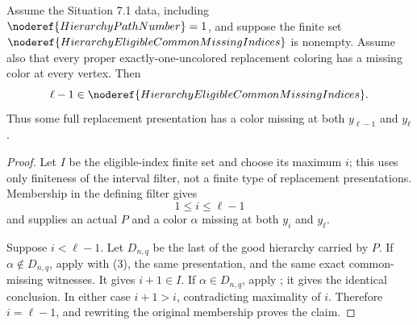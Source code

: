 \begin{lemma}
Assume the Situation 7.1 data, including
\(\noderef{HierarchyPathNumber}=1\), and suppose the finite set
\(\noderef{HierarchyEligibleCommonMissingIndices}\) is nonempty.  Assume
also that every proper exactly-one-uncolored replacement coloring has a
missing color at every vertex.  Then
\[
 \ell-1\in\noderef{HierarchyEligibleCommonMissingIndices}.
\]
Thus some full replacement presentation has a color missing at both
\(y_{\ell-1}\) and \(y_\ell\).
\end{lemma}
\begin{proof}
Let \(I\) be the eligible-index finite set and choose its maximum \(i\);
this uses only finiteness of the interval filter, not a finite type of
replacement presentations.  Membership in the defining filter gives
\[
 1\leq i\leq\ell-1                                      \tag{3}
\]
and supplies an actual
 \(P\) and a color \(\alpha\)
missing at both \(y_i\) and \(y_\ell\).

Suppose \(i<\ell-1\).  Let \(D_{n,q}\) be the last
 of the good hierarchy carried by \(P\).
If \(\alpha\notin D_{n,q}\), apply
 with (3), the same
presentation, and the same exact common-missing witnesses.  It gives
\(i+1\in I\).  If \(\alpha\in D_{n,q}\), apply
; it gives the identical
conclusion.  In either case \(i+1>i\), contradicting maximality of \(i\).
Therefore \(i=\ell-1\), and rewriting the original membership proves the
claim.
\end{proof}
